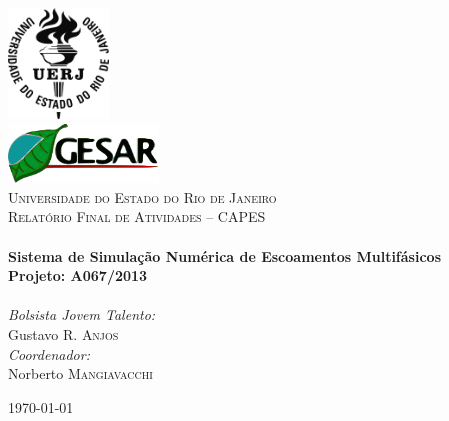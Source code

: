 \typeout{ ====================================================================}
\typeout{ ====================================================================}

\begin{titlepage}
\begin{center}

\includegraphics[width=0.2\textwidth]{./figs/uerj.png}~\\[1cm]
\includegraphics[width=0.3\textwidth]{./figs/gesar.png}~\\[1cm]

\textsc{\LARGE Universidade do Estado do Rio de Janeiro}\\[1.5cm]

\textsc{\Large Relatório Final de Atividades -- CAPES}\\[0.5cm]

\HRule \\[0.4cm]
{ \huge \bfseries Sistema de Simulação Numérica de Escoamentos
Multifásicos\\[0.4cm] }
{ \Large \bfseries Projeto: A067/2013\\[0.4cm] }
\HRule \\[1.0cm]

\noindent
\large
\emph{Bolsista Jovem Talento:}\\
Gustavo R. \textsc{Anjos}\\
\vspace{0.3cm}
\emph{Coordenador:}\\
Norberto \textsc{Mangiavacchi}\\
\vfill

{\large \today}

\end{center}
\end{titlepage}


